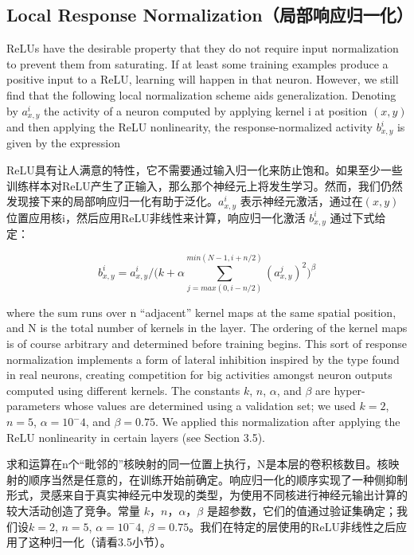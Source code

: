 \documentclass[12pt,a4paper,UTF8,twoside]{book}
\begin{document}
\hypertarget{local-response-normalizationux5c40ux90e8ux54cdux5e94ux5f52ux4e00ux5316}{%
\subsection{Local Response Normalization（局部响应归一化）}\label{local-response-normalizationux5c40ux90e8ux54cdux5e94ux5f52ux4e00ux5316}}

ReLUs have the desirable property that they do not require input normalization to prevent them from saturating. If at least some training examples produce a positive input to a ReLU, learning will happen in that neuron. However, we still find that the following local normalization scheme aids generalization. Denoting by \(a^i_{x,y}\) the activity of a neuron computed by applying kernel i at position \((x, y)\) and then applying the ReLU nonlinearity, the response-normalized activity \(b^i_{x,y}\) is given by the expression

ReLU具有让人满意的特性，它不需要通过输入归一化来防止饱和。如果至少一些训练样本对ReLU产生了正输入，那么那个神经元上将发生学习。然而，我们仍然发现接下来的局部响应归一化有助于泛化。\(a^i_{x,y}\) 表示神经元激活，通过在\((x, y)\)位置应用核i，然后应用ReLU非线性来计算，响应归一化激活 \(b^i_{x,y}\) 通过下式给定：

\[b^i_{x,y} = a^i_{x,y}/\bigg(k+\alpha\sum\limits_{j=max(0,i-n/2)}^{min(N-1,i+n/2)}(a_{x,y}^j)^2\bigg)^\beta\]

where the sum runs over n ``adjacent'' kernel maps at the same spatial position, and N is the total number of kernels in the layer. The ordering of the kernel maps is of course arbitrary and determined before training begins. This sort of response normalization implements a form of lateral inhibition inspired by the type found in real neurons, creating competition for big activities amongst neuron outputs computed using different kernels. The constants \(k\), \(n\), \(\alpha\), and \(\beta\) are hyper-parameters whose values are determined using a validation set; we used \(k = 2\), \(n = 5\), \(\alpha = 10^−4\), and \(\beta = 0.75\). We applied this normalization after applying the ReLU nonlinearity in certain layers (see Section 3.5).

求和运算在n个``毗邻的''核映射的同一位置上执行，N是本层的卷积核数目。核映射的顺序当然是任意的，在训练开始前确定。响应归一化的顺序实现了一种侧抑制形式，灵感来自于真实神经元中发现的类型，为使用不同核进行神经元输出计算的较大活动创造了竞争。常量 \(k\)，\(n\)，\(\alpha\)，\(\beta\) 是超参数，它们的值通过验证集确定；我们设\(k = 2\), \(n = 5\), \(\alpha = 10^−4\), \(\beta = 0.75\)。我们在特定的层使用的ReLU非线性之后应用了这种归一化（请看3.5小节）。
\end{document}
